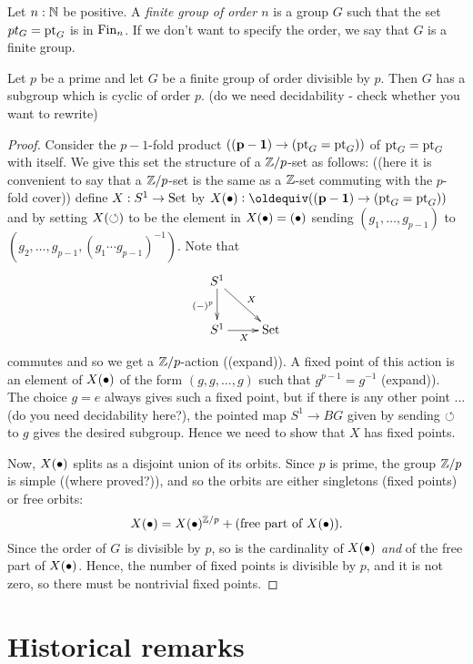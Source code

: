 \begin{definition}
  \label{def:finitegrd}Let $n:\mathbb{N}$ be positive.  A \emph{finite group of order $n$} is a group $G$ such that the set $pt_G={\mathord{\mathrm{pt}}}_G$ is in $\operatorname{Fin}_n$.  If we don't want to specify the order, we say that $G$ is a finite group. 
\end{definition}
\begin{lemma}
  \label{lem:cauchys}
  Let $p$ be a prime and let $G$ be a finite group of order divisible by $p$.  Then $G$ has a subgroup which is cyclic of order $p$. (do we need decidability - check whether you want to rewrite)
\end{lemma}
\begin{proof}
  Consider  the $p-1$-fold product $(\mathbf{(p-1)}\to ({\mathord{\mathrm{pt}}}_G={\mathord{\mathrm{pt}}}_G))$ of ${\mathord{\mathrm{pt}}}_G={\mathord{\mathrm{pt}}}_G$ with itself.  We give this set the structure of a $\mathbb{Z}/p$-set as follows: ((here it is convenient to say that a $\mathbb{Z}/p$-set is the same as a $\mathbb{Z}$-set commuting with the $p$-fold cover)) define $X:S^1\to\mathord{\mathrm{Set}}$ by $X(\base)\defequi (\bn{(p-1)}\to (\pt_G=\pt_G))$ and by setting $X(\circlearrowleft)$ to be the element in $X(\bullet)=(\bullet)$ sending $(g_1,\dots,g_{p-1})$ to $(g_2,\dots,g_{p-1},(g_1\cdots g_{p-1})^{-1})$.  Note that
$$\xymatrix{S^1\ar[d]_{(-)^p}\ar[dr]^X&\\S^1\ar[r]_X&\Set}$$
commutes and so we get a $\mathbb{Z}/p$-action ((expand)).  A fixed point of this action is an element of $X(\bullet)$ of the form $(g,g,\dots,g)$ such that $g^{p-1}=g^{-1}$  (expand)). The choice $g=e$ always gives such a fixed point, but if there is any other point ... (do you need decidability here?), the pointed map $S^1\to BG$ given by sending $\circlearrowleft$ to $g$ gives the desired subgroup. Hence we need to show that $X$ has fixed points.

Now, $X(\bullet)$ splits as a disjoint union of its orbits.  Since $p$ is prime, the group $\mathbb{Z}/p$ is simple ((where proved?)), and so the orbits are either singletons (fixed points) or free orbits:
$$X(\bullet)= X(\bullet)^{\mathbb{Z}/p}+(\text{free part of }X(\bullet)).$$
Since the order of $G$ is divisible by $p$, so is the cardinality of $X(\bullet)$ \emph{and} of the free part of $X(\bullet)$.  Hence, the number of fixed points is divisible by $p$, and it is not zero, so there must be nontrivial fixed points.
\end{proof}
\section{Historical remarks}
\label{sec:grouphistory}

